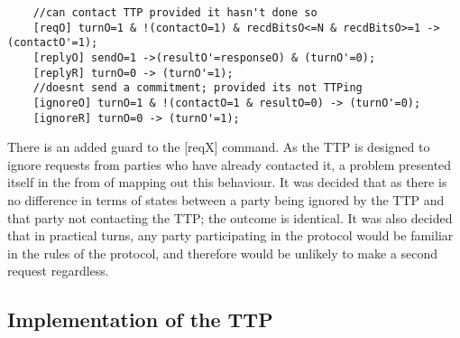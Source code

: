 \documentclass{l4proj}
\begin{document}
\begin{lstlisting}
    //can contact TTP provided it hasn't done so
    [reqO] turnO=1 & !(contactO=1) & recdBitsO<=N & recdBitsO>=1 -> (contactO'=1);
    [replyO] sendO=1 ->(resultO'=responseO) & (turnO'=0);
    [replyR] turnO=0 -> (turnO'=1);
    //doesnt send a commitment; provided its not TTPing
    [ignoreO] turnO=1 & !(contactO=1 & resultO=0) -> (turnO'=0);
	[ignoreR] turnO=0 -> (turnO'=1);
\end{lstlisting}

There is an added guard to the [reqX] command. As the TTP is designed to ignore requests from parties who have already contacted it, a problem presented itself in the from of mapping out this behaviour. It was decided that as there is no difference in terms of states between a party being ignored by the TTP and that party not contacting the TTP; the outcome is identical. It was also decided that in practical turns, any party participating in the protocol would be familiar in the rules of the protocol, and therefore would be unlikely to make a second request regardless.\\

\subsection{Implementation of the TTP}
\end{document}
